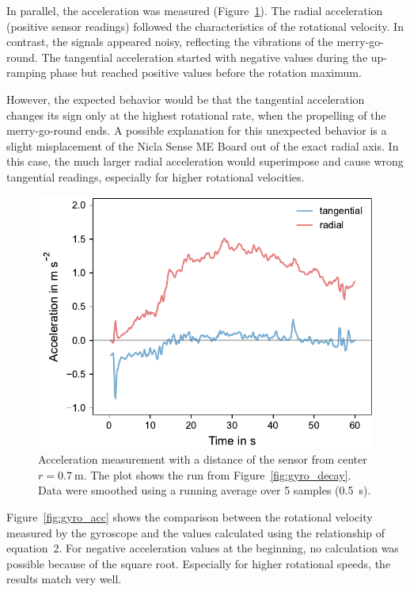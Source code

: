 \documentclass[DIV=14]{scrartcl}
\begin{document}
    In parallel, the acceleration was measured (Figure~\ref{fig:acc}). The radial acceleration (positive sensor readings) followed the characteristics of the rotational velocity. In contrast, the signals appeared noisy, reflecting the vibrations of the merry-go-round. The tangential acceleration started with negative values during the up-ramping phase but reached positive values before the rotation maximum.

    However, the expected behavior would be that the tangential acceleration changes its sign only at the highest rotational rate, when the propelling of the merry-go-round ends. A possible explanation for this unexpected behavior is a slight misplacement of the Nicla Sense ME Board out of the exact radial axis. In this case, the much larger radial acceleration would superimpose and cause wrong tangential readings, especially for higher rotational velocities.

    \begin{figure}[h!]
        \centering
        \includegraphics[width=.6\textwidth]{plots/acc_2.pdf}
        \caption{Acceleration measurement with a distance of the sensor from center $r=\SI{0.7}{\metre}$. The plot shows the run from Figure~\ref{fig:gyro_decay}. Data were smoothed using a running average over 5 samples (\SI{0.5}{\second}).}
        \label{fig:acc}
    \end{figure}

    Figure~\ref{fig:gyro_acc} shows the comparison between the rotational velocity measured by the gyroscope and the values calculated using the relationship of equation~2. For negative acceleration values at the beginning, no calculation was possible because of the square root. Especially for higher rotational speeds, the results match very well.
\end{document}
